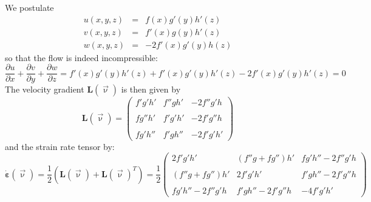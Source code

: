 We postulate
\begin{eqnarray}
u(x,y,z) &=& f(x) g'(y) h'(z) \\
v(x,y,z) &=& f'(x) g(y) h'(z) \\
w(x,y,z) &=& -2f'(x) g'(y) h(z) 
\end{eqnarray}
so that the flow is indeed incompressible: 
\[
\frac{\partial u}{\partial x}+
\frac{\partial v}{\partial y}+
\frac{\partial w}{\partial z}
=
f'(x) g'(y) h'(z) + f'(x) g'(y) h'(z) -2f'(x) g'(y) h'(z)
=0
\]
The velocity gradient ${\bm L}(\vec\upnu)$ is then given by
\[
{\bm L}(\vec\upnu) =
\left(
\begin{array}{ccc}
f'g'h' &  f'' g h' & -2f'' g' h \\ \\
fg''h' & f'g'h'    & -2f' g'' h \\ \\
fg'h'' & f'gh''    & -2f'g'h'
\end{array}
\right)
\]
and the strain rate tensor by:
\[
\dot{\bm \varepsilon}(\vec\upnu)
=\frac{1}{2}({\bm L}(\vec\upnu)+{\bm L}(\vec\upnu)^T)
=
\frac{1}{2}
\left(
\begin{array}{ccc}
2f'g'h' & (f'' g+fg'') h'  & fg'h''-2f'' g' h \\ \\
(f''g+fg'')h' & 2f'g'h'    & f'gh''-2f' g'' h \\ \\
fg'h'' -2f'' g' h & f'gh'' -2f' g'' h    & -4f'g'h'
\end{array}
\right)
\]

